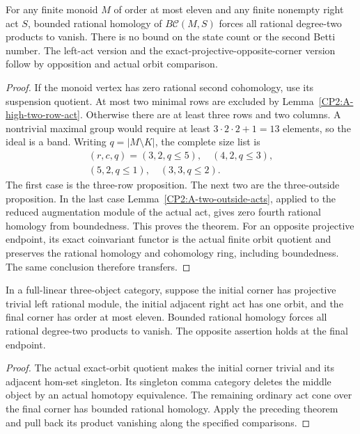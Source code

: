 \begin{theorem}
\label{CP2:A-bounded-eleven-acts}
For any finite monoid $M$ of order at most eleven and
any finite nonempty right act $S$, bounded rational
homology of $B\mathcal C(M,S)$ forces all rational
degree-two products to vanish. There is no bound on
the state count or the second Betti number. The left-act
version and the exact-projective-opposite-corner version
follow by opposition and actual orbit comparison.
\end{theorem}
\begin{proof}
If the monoid vertex has zero rational second cohomology,
use its suspension quotient. At most two minimal rows
are excluded by Lemma~\ref{CP2:A-high-two-row-act}.
Otherwise there are at least three rows and two columns.
A nontrivial maximal group would require at least
$3\cdot2\cdot2+1=13$ elements, so the ideal is a band.
Writing $q=|M\setminus K|$, the complete size list is
\[
\begin{gathered}
 (r,c,q)=(3,2,q\leq5),\quad (4,2,q\leq3),\\
 (5,2,q\leq1),\quad (3,3,q\leq2).
\end{gathered}
\]
The first case is the three-row proposition. The next
two are the three-outside proposition. In the last case
Lemma~\ref{CP2:A-two-outside-acts}, applied to the reduced
augmentation module of the actual act, gives zero fourth
rational homology from boundedness. This proves the theorem.
For an opposite projective endpoint, its exact coinvariant
functor is the actual finite orbit quotient and preserves
the rational homology and cohomology ring, including
boundedness. The same conclusion therefore transfers.
\end{proof}

\begin{corollary}
\label{CP2:A-eleven-projective-singleton}
In a full-linear three-object category, suppose the initial
corner has projective trivial left rational module, the
initial adjacent right act has one orbit, and the final
corner has order at most eleven. Bounded rational homology
forces all rational degree-two products to vanish.
The opposite assertion holds at the final endpoint.
\end{corollary}
\begin{proof}
The actual exact-orbit quotient makes the initial corner
trivial and its adjacent hom-set singleton. Its singleton
comma category deletes the middle object by an actual
homotopy equivalence. The remaining ordinary act cone
over the final corner has bounded rational homology.
Apply the preceding theorem and pull back its product
vanishing along the specified comparisons.
\end{proof}
